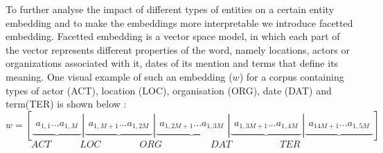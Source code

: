 \noindent
To further analyse the impact of different types of entities on a certain entity embedding and to make the embeddings more interpretable we introduce facetted embedding. Facetted embedding is a vector space model, in which each part of the vector represents different properties of the word, namely locations, actors or organizations associated with it, dates of its mention and terms that define its meaning. One visual example of such an embedding ($w$) for a corpus containing types of actor (ACT), location (LOC), organisation (ORG), date (DAT) and term(TER) is shown below : \\
\mathleft
\begin{equation}
w=\left[ \underbrace { \begin{matrix}{ a }_{ 1,1 } ... { a }_{ 1,M } \end{matrix} } |\underbrace { \begin{matrix}{ a }_{ 1,M+1 } ... { a }_{ 1,2M } \end{matrix} } |\underbrace { \begin{matrix}{ a }_{ 1,2M+1 } ... { a }_{ 1,3M } \end{matrix} } |\underbrace { \begin{matrix}{ a }_{ 1,3M+1 } ... { a }_{ 1,4M } \end{matrix} } |\underbrace { \begin{matrix}{ a }_{ 14M+1 } ... { a }_{ 1,5M } \end{matrix} }  \right] 
\label{eq:concat_vec}
\end{equation}
$$ \quad  ACT \quad  \qquad  LOC\qquad \qquad ORG\qquad \quad \qquad DAT\qquad \quad  \qquad  TER\qquad \qquad$$
\mathcenter
\\
